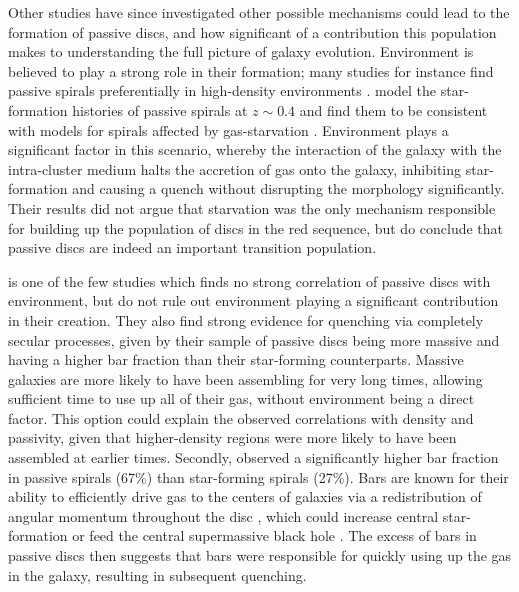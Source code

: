 \documentclass[useAMS,usenatbib]{mn2e}
\begin{document}
Other studies have since investigated other possible mechanisms could lead to the formation of passive discs, and how significant of a contribution this population makes to understanding the full picture of galaxy evolution. Environment is believed to play a strong role in their formation; many studies for instance find passive spirals preferentially in high-density environments \citep{Dressler1999, Poggianti1999, Goto2003, Deng2009, Hughes2009}. \citet{Moran2006} model the star-formation histories of passive spirals at $z\sim0.4$ and find them to be consistent with models for spirals affected by gas-starvation \citep{Larson1980, Quilis2000, Bekki2002}. Environment plays a significant factor in this scenario, whereby the interaction of the galaxy with the intra-cluster medium halts the accretion of gas onto the galaxy, inhibiting star-formation and causing a quench without disrupting the morphology significantly. Their results did not argue that starvation was the only mechanism responsible for building up the population of discs in the red sequence, but do conclude that passive discs are indeed an important transition population.

\citet{Masters2010} is one of the few studies which finds no strong correlation of passive discs with environment, but do not rule out environment playing a significant contribution in their creation. They also find strong evidence for quenching via completely secular processes, given by their sample of passive discs being more massive and having a higher bar fraction than their star-forming counterparts. Massive galaxies are more likely to have been assembling for very long times, allowing sufficient time to use up all of their gas, without environment being a direct factor. This option could explain the observed correlations with density and passivity, given that higher-density regions were more likely to have been assembled at earlier times. Secondly, \citet{Masters2010} observed a significantly higher bar fraction in passive spirals (67\%) than star-forming spirals (27\%). Bars are known for their ability to efficiently drive gas to the centers of galaxies via a redistribution of angular momentum throughout the disc \citep{Sellwood1993,Shlosman1989,Ann2005}, which could increase central star-formation \citep{Hawarden1986,Ho1997} or feed the central supermassive black hole \citep{Athanassoula1992,Friedli1993}. The excess of bars in passive discs then suggests that bars were responsible for quickly using up the gas in the galaxy, resulting in subsequent quenching. 
\end{document}
